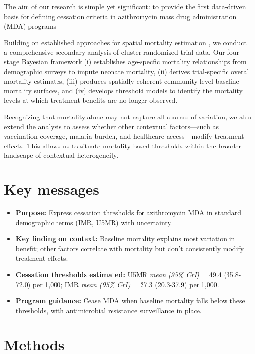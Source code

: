 \documentclass[11pt]{article}\usepackage[]{graphicx}\usepackage[]{xcolor}
\begin{document}
The aim of our research is simple yet significant: to provide the first data-driven basis for defining cessation criteria in azithromycin mass drug administration (MDA) programs.

Building on established approaches for spatial mortality estimation \citep{besag1991bym, mercer2015aoas, wakefield2020insr}, we conduct a comprehensive secondary analysis of cluster-randomized trial data. Our four-stage Bayesian framework (i) establishes age-specfic mortality relationships from demographic surveys to impute neonate mortality, (ii) derives trial-specific overal mortality estimates, (iii) produces spatially coherent community-level baseline mortality surfaces, and (iv) develops threshold models to identify the mortality levels at which treatment benefits are no longer observed.

Recognizing that mortality alone may not capture all sources of variation, we also extend the analysis to assess whether other contextual factors—such as vaccination coverage, malaria burden, and healthcare access—modify treatment effects. This allows us to situate mortality-based thresholds within the broader landscape of contextual heterogeneity.


\section*{Key messages}



\begin{itemize}[leftmargin=1.1em]
\item \textbf{Purpose:} Express cessation thresholds for azithromycin MDA in standard demographic terms (IMR, U5MR) with uncertainty.
\item \textbf{Key finding on context:} Baseline mortality explains most variation in benefit; other factors correlate with mortality but don't consistently modify treatment effects.
\item \textbf{Cessation thresholds estimated:} U5MR \emph{mean (95\% CrI)} = 49.4 (35.8-72.0) per 1,000; IMR \emph{mean (95\% CrI)} = 27.3 (20.3-37.9) per 1,000.
\item \textbf{Program guidance:} Cease MDA when baseline mortality falls below these thresholds, with antimicrobial resistance surveillance in place.
\end{itemize}

\clearpage

\section{Methods}
\end{document}
